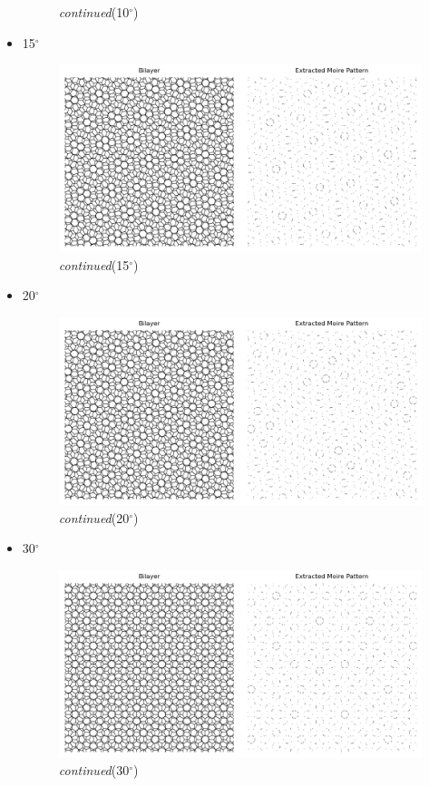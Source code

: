 \documentclass[12pt,a4paper]{article}
\begin{document}
\begin{CJK}{UTF8}{bkai}
\begin{itemize}
\begin{figure}[h]
        \vspace{-0.5cm}
        \caption{\textit{continued}(10$^\circ$)}
        \label{fig:moire_10_extract}
    \end{figure}
    \clearpage
    \item 15$^\circ$
    \begin{figure}[h]
        \centering
        \vspace{-0.5cm}
        \includegraphics[width=0.65\linewidth]{figures/15degree_moire.png}
        \vspace{-0.5cm}
        \caption{\textit{continued}(15$^\circ$)}
        \label{fig:moire_15_extract}
    \end{figure}
    \item 20$^\circ$
    \begin{figure}[h]
        \centering
        \vspace{-0.5cm}
        \includegraphics[width=0.65\linewidth]{figures/20degree_moire.png}
        \vspace{-0.5cm}
        \caption{\textit{continued}(20$^\circ$)}
        \label{fig:moire_20_extract}
    \end{figure}
    \item 30$^\circ$
    \begin{figure}[h]
        \centering
        \vspace{-0.5cm}
        \includegraphics[width=0.65\linewidth]{figures/30degree_moire.png}
        \vspace{-0.5cm}
        \caption{\textit{continued}(30$^\circ$)}
        \label{fig:moire_30_extract}
    \end{figure}
    

\end{itemize}
\end{CJK}
\end{document}

